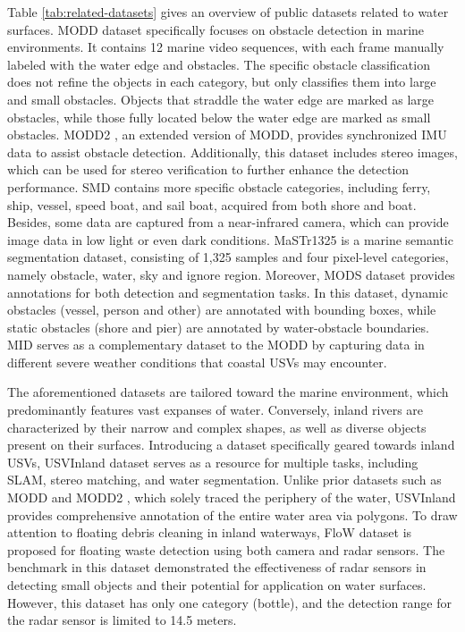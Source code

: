 \documentclass[lettersize,journal]{IEEEtran}
\begin{document}
Table \ref{tab:related-datasets} gives an overview of public datasets related to water surfaces.
MODD \cite{kristan2015fast} dataset specifically focuses on obstacle detection in marine environments. It contains 12 marine video sequences, with each frame manually labeled with the water edge and obstacles. The specific obstacle classification does not refine the objects in each category, but only classifies them into large and small obstacles. Objects that straddle the water edge are marked as large obstacles, while those fully located below the water edge are marked as small obstacles.
MODD2 \cite{bovcon2018stereo}, an extended version of MODD, provides synchronized IMU data to assist obstacle detection. Additionally, this dataset includes stereo images, which can be used for stereo verification to further enhance the detection performance.
SMD \cite{moosbauer2019benchmark} contains more specific obstacle categories, including ferry, ship, vessel, speed boat, and sail boat, acquired from both shore and boat. Besides, some data are captured from a near-infrared camera, which can provide image data in low light or even dark conditions.
MaSTr1325 \cite{bovcon2019mastr1325} is a marine semantic segmentation dataset, consisting of 1,325 samples and four pixel-level categories, namely obstacle, water, sky and ignore region.
Moreover, MODS \cite{bovcon2021mods} dataset provides annotations for both detection and segmentation tasks. In this dataset, dynamic obstacles (vessel, person and other) are annotated with bounding boxes, while static obstacles (shore and pier) are annotated by water-obstacle boundaries. 
MID \cite{liu2021efficient} serves as a complementary dataset to the MODD \cite{kristan2015fast} by capturing data in different severe weather conditions that coastal USVs may encounter.

The aforementioned datasets are tailored toward the marine environment, which predominantly features vast expanses of water. Conversely, inland rivers are characterized by their narrow and complex shapes, as well as diverse objects present on their surfaces.
Introducing a dataset specifically geared towards inland USVs, USVInland \cite{cheng2021we} dataset serves as a resource for multiple tasks, including SLAM, stereo matching, and water segmentation. Unlike prior datasets such as MODD \cite{kristan2015fast} and MODD2 \cite{bovcon2018stereo}, which solely traced the periphery of the water, USVInland provides comprehensive annotation of the entire water area via polygons.
To draw attention to floating debris cleaning in inland waterways, FloW \cite{cheng2021flow} dataset is proposed for floating waste detection using both camera and radar sensors. The benchmark in this dataset demonstrated the effectiveness of radar sensors in detecting small objects and their potential for application on water surfaces. However, this dataset has only one category (bottle), and the detection range for the radar sensor is limited to 14.5 meters. 
\end{document}
